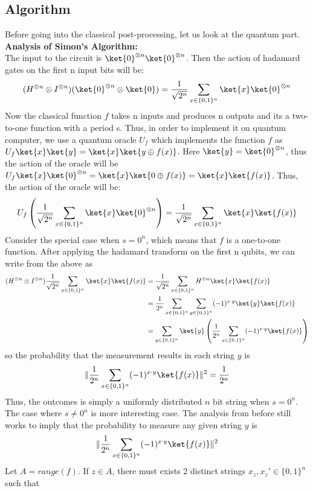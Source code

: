 \documentclass[12pt, oneside]{book}
\theoremstyle{definition}
\theoremstyle{definition}
\theoremstyle{remark}
\begin{document}
\subsection{Algorithm}
Before going into the classical post-processing, let us look at the quantum part.\\
\textbf{Analysis of Simon's Algorithm: }\\
The input to the circuit is $\ket{0}^{\otimes n}\ket{0}^{\otimes n}$. 
Then the action of hadamard gates on the first n input bits will be:
\[
(H^{\otimes n} \otimes I^{\otimes n})(\ket{0}^{\otimes n} \otimes \ket{0})=\frac{1}{\sqrt{2^n}}\sum_{x \in \{0,1\}^n}\ket{x}\ket{0}^{\otimes n}
\]
Now the classical function $f$ takes n inputs and produces n outputs and its a two-to-one function with a period s. Thus, in order to implement it on quantum computer, 
we use a quantum oracle $U_f$ which implements the function $f$ as $U_f\ket{x}\ket{y}=\ket{x}\ket{y\oplus f(x)}$.
Here $\ket{y}=\ket{0}^{\otimes n}$, thus the action of the oracle will be $U_f\ket{x}\ket{0}^{\otimes n}=\ket{x}\ket{0 \oplus f(x)}=\ket{x}\ket{f(x)}$.
Thus, the action of the oracle will be:
\[
    U_f\left(\frac{1}{\sqrt{2^n}}\sum_{x \in \{0,1\}^n}\ket{x}\ket{0}^{\otimes n}\right)=\frac{1}{\sqrt{2^n}}\sum_{x \in \{0,1\}^n}\ket{x}\ket{f(x)}
\]
Consider the special case when $s=0^n$, which means that $f$ is a one-to-one function. After applying the hadamard transform on the first n qubits, we can write from the above as
\begin{align*}
(H^{\otimes n}\otimes I^{\otimes n})\frac{1}{\sqrt{2^n}}\sum_{x \in \{0,1\}^n}\ket{x}\ket{f(x)}&=\frac{1}{\sqrt{2^n}}\sum_{x \in \{0,1\}^n}H^{\otimes n}\ket{x}\ket{f(x)}\\
&=\frac{1}{2^n}\sum_{x \in \{0,1\}^n}\sum_{y\in\{0,1\}^n} (-1)^{x \cdot y} \ket{y}\ket{f(x)}\\
&=\sum_{y\in\{0,1\}^n}\ket{y}\left(\frac{1}{2^n} \sum_{x\in\{0,1\}^n} (-1)^{x \cdot y} \ket{f(x)}\right)
\end{align*}
so the probability that the measurement results in each string $y$ is
\[
\|\frac{1}{2^n}\sum_{x\in\{0,1\}^n} (-1)^{x\cdot y} \ket{f(x)}\|^2=\frac{1}{2^n}
\]
Thus, the outcomes is simply a uniformly distributed $n$ bit string when $s=0^n$.
The case where $s\neq0^n$ is more interesting case. The analysis from before still works to imply that the probability to measure any given string $y$ is
\[
\|\frac{1}{2^n}\sum_{x\in\{0,1\}^n} (-1)^{x\cdot y} \ket{f(x)}\|^2
\]
Let $A=range(f)$. If $z\in A$, there must exists 2 distinct strings $x_z,x_z' \in \{0,1\}^n$ such that
\end{document}
